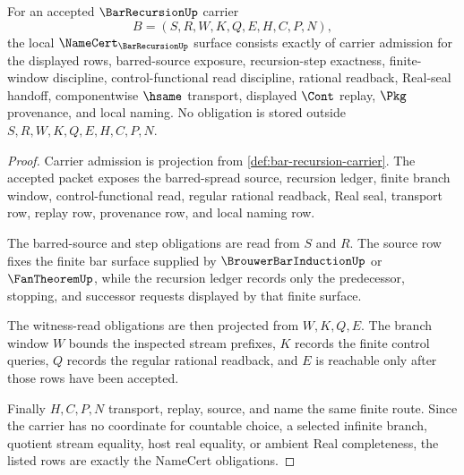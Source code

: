 \begin{theorem}
\label{thm:bar-recursion-namecert-obligations}
For an accepted $\BarRecursionUp$ carrier
$$
B=(S,R,W,K,Q,E,H,C,P,N),
$$
the local $\NameCert_{\BarRecursionUp}$ surface consists exactly of carrier admission for the displayed rows, barred-source exposure, recursion-step exactness, finite-window discipline, control-functional read discipline, rational readback, Real-seal handoff, componentwise $\hsame$ transport, displayed $\Cont$ replay, $\Pkg$ provenance, and local naming. No obligation is stored outside $S,R,W,K,Q,E,H,C,P,N$.
\end{theorem}
\begin{proof}
Carrier admission is projection from \autoref{def:bar-recursion-carrier}. The accepted packet exposes the barred-spread source, recursion ledger, finite branch window, control-functional read, regular rational readback, Real seal, transport row, replay row, provenance row, and local naming row.

The barred-source and step obligations are read from $S$ and $R$. The source row fixes the finite bar surface supplied by $\BrouwerBarInductionUp$ or $\FanTheoremUp$, while the recursion ledger records only the predecessor, stopping, and successor requests displayed by that finite surface.

The witness-read obligations are then projected from $W,K,Q,E$. The branch window $W$ bounds the inspected stream prefixes, $K$ records the finite control queries, $Q$ records the regular rational readback, and $E$ is reachable only after those rows have been accepted.

Finally $H,C,P,N$ transport, replay, source, and name the same finite route. Since the carrier has no coordinate for countable choice, a selected infinite branch, quotient stream equality, host real equality, or ambient Real completeness, the listed rows are exactly the NameCert obligations.
\end{proof}

